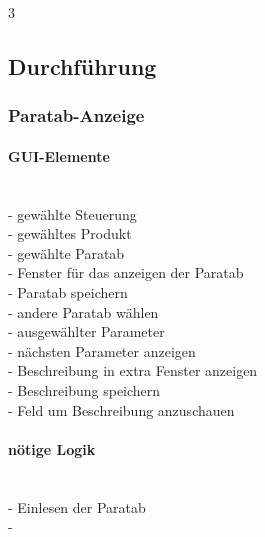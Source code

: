 3\documentclass[12pt,a4paper]{article}
\begin{document}
\subsection{Durchführung}
\subsubsection{Paratab-Anzeige}
\paragraph{GUI-Elemente}\\
- gewählte Steuerung\\- gewähltes Produkt\\- gewählte Paratab\\- Fenster für das anzeigen der Paratab\\- Paratab speichern\\- andere Paratab wählen\\- ausgewählter Parameter\\- nächsten Parameter anzeigen\\- Beschreibung in extra Fenster anzeigen\\- Beschreibung speichern\\- Feld um Beschreibung anzuschauen
\paragraph{nötige Logik}
\\- Einlesen der Paratab\\
-
\end{document}
